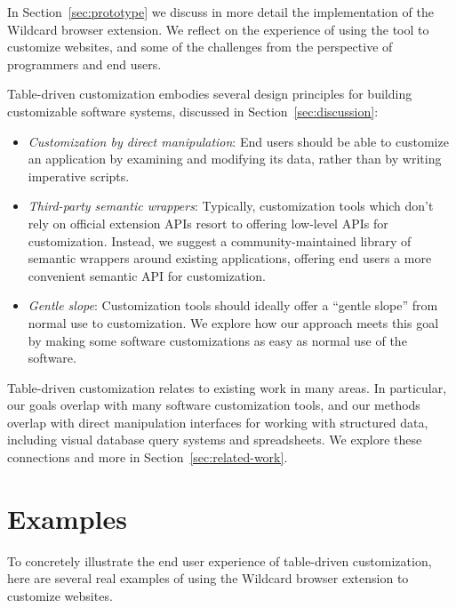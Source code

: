 \documentclass[sigplan,10pt,anonymous,review]{acmart}
\providecommand{\tightlist}{%
  \setlength{\itemsep}{0pt}\setlength{\parskip}{0pt}}
\begin{document}
In Section~\ref{sec:prototype} we discuss in more detail the
implementation of the Wildcard browser extension. We reflect on the
experience of using the tool to customize websites, and some of the
challenges from the perspective of programmers and end users.

Table-driven customization embodies several design principles for
building customizable software systems, discussed in
Section~\ref{sec:discussion}:

\begin{itemize}
\tightlist
\item
  \emph{Customization by direct manipulation}: End users should be able
  to customize an application by examining and modifying its data,
  rather than by writing imperative scripts.
\item
  \emph{Third-party semantic wrappers}: Typically, customization tools
  which don't rely on official extension APIs resort to offering
  low-level APIs for customization. Instead, we suggest a
  community-maintained library of semantic wrappers around existing
  applications, offering end users a more convenient semantic API for
  customization.
\item
  \emph{Gentle slope}: Customization tools should ideally offer a
  ``gentle slope'' from normal use to customization. We explore how our
  approach meets this goal by making some software customizations as
  easy as normal use of the software.
\end{itemize}

Table-driven customization relates to existing work in many areas. In
particular, our goals overlap with many software customization tools,
and our methods overlap with direct manipulation interfaces for working
with structured data, including visual database query systems and
spreadsheets. We explore these connections and more in
Section~\ref{sec:related-work}.

\hypertarget{sec:examples}{%
\section{Examples}\label{sec:examples}}

To concretely illustrate the end user experience of table-driven
customization, here are several real examples of using the Wildcard
browser extension to customize websites.
\end{document}
